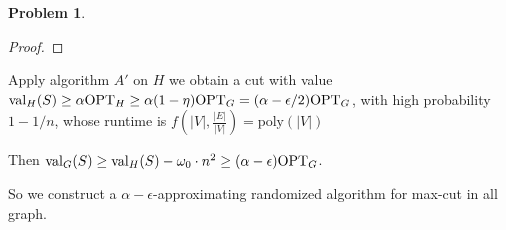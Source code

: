 \documentclass[a4paper]{article}
\theoremstyle{definition}
\newtheorem{problem}{Problem}
\theoremstyle{plain}
\newcommand{\Ebb}{\mathop\mathbb E}
\newcommand{\dps}{\displaystyle}
\newcommand{\<}{\left<}
\renewcommand{\>}{\right>}
\newcommand{\OPT}{\mathrm{OPT}}
\numberwithin{equation}{problem}
\newcommand{\st}{ \textit{ s.t. }}
\begin{document}
\begin{problem}
\begin{proof}
\end{proof}

Apply algorithm  $ A' $ on  $ H $ we obtain  a cut with value  $ \val_H(S) \geq \alpha\OPT_H \geq \alpha(1-\eta)\OPT_G=(\alpha-\epsilon/2)\OPT_G $, with high probability $ 1-1/n $, whose runtime is  $ f(|V|,\frac{|E|}{|V|})=\mathrm{poly}(|V|) $

Then  $ \val_G(S) \geq \val_H(S)-\omega_0\cdot n^2 \geq (\alpha-\epsilon)\OPT_G $.

So we construct a  $ \alpha-\epsilon $-approximating randomized algorithm for max-cut in all graph. 
  

  
  





\end{problem}
\end{document}
